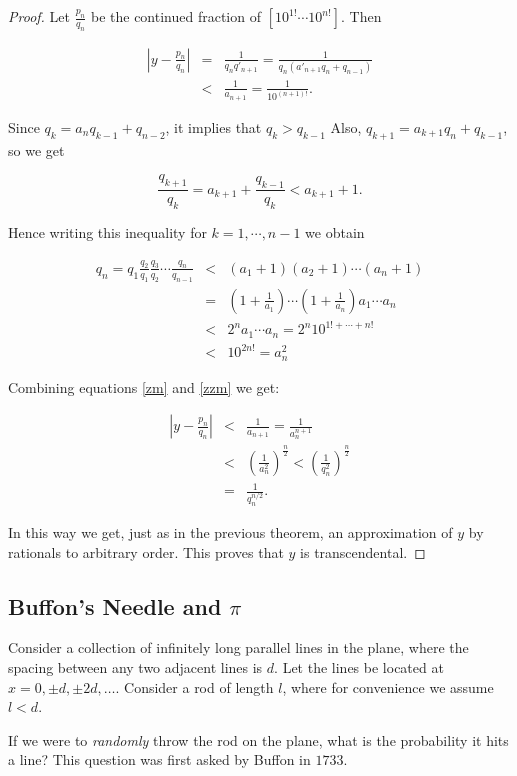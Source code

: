 \documentclass[12pt,letterpaper]{report}
\newcommand\be{\begin{equation}}
\newcommand\ee{\end{equation}}
\newcommand\bea{\begin{eqnarray}}
\newcommand\eea{\end{eqnarray}}
\newcommand{\pn}{p_n}
\newcommand{\qn}{q_n}
\begin{document}
\begin{proof}
Let $\frac{\pn}{\qn}$ be the continued fraction of $[10^{1!}\cdots
10^{n!}]$. Then

\bea \label{zm} \left|y-\frac{\pn}{\qn}\right|&=&\frac{1}{q_n
q'_{n+1}}=
\frac{1}{\qn (a'_{n+1}\qn +q_{n-1})}\nonumber\\
&<&\frac{1}{a_{n+1}}=\frac{1}{10^{(n+1)!}}. \eea

Since $q_k=a_nq_{k-1}+q_{n-2}$, it implies that $q_k>q_{k-1}$
Also, $q_{k+1}=a_{k+1}q_n+q_{k-1}$, so we get

\be \frac{q_{k+1}}{q_k}=a_{k+1}+\frac{q_{k-1}}{q_k} <a_{k+1}+1.\ee

Hence writing this inequality for  $k=1,\cdots, n-1$ we obtain

\bea \label{zzm}
q_n=q_1\frac{q_2}{q_1}\frac{q_3}{q_2}\cdots\frac{q_n}{q_{n-1}}
&<&(a_1+1)(a_2+1)\cdots(a_n+1)\nonumber\\
&=&(1+\frac{1}{a_1})\cdots(1+\frac{1}{a_n})a_1\cdots a_n\nonumber\\
&<&2^na_1\cdots a_n=2^n10^{1!+\cdots+n!}\nonumber\\
&<&10^{2n!}=a_n^2 \eea

Combining equations \ref{zm} and \ref{zzm} we get:

\bea \left|y-\frac{\pn}{\qn}\right|&<&\frac{1}{a_{n+1}}
=\frac{1}{a_n^{n+1}}\nonumber\\
&<&\left(\frac{1}{a_n^2}\right)^{\frac{n}{2}}
<\left(\frac{1}{q_n^2}\right)^{\frac{n}{2}}\nonumber\\
&=&\frac{1}{q_n^{n/2}}. \eea

In this way we get, just as in the previous theorem, an
approximation of $y$ by rationals to arbitrary order. This proves
that $y$ is transcendental.

\end{proof}

\subsection{Buffon's Needle and $\pi$}

Consider a collection of infinitely long parallel lines in the
plane, where the spacing between any two adjacent lines is $d$.
Let the lines be located at $x = 0, \pm d, \pm 2d, \dots$.
Consider a rod of length $l$, where for convenience we assume $l <
d$.

If we were to \emph{randomly} throw the rod on the plane, what is
the probability it hits a line? This question was first asked by
Buffon in $1733$.
\end{document}
